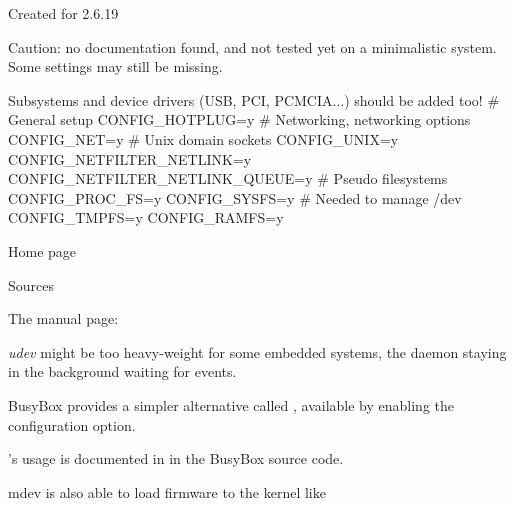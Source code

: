   \startitemize
  \item Created for 2.6.19
  \item Caution: no documentation found, and not tested yet on a minimalistic system. Some settings may still be missing.
  \item Subsystems and device drivers (USB, PCI, PCMCIA...) should be added too!
  \stopitemize
\starttyping
# General setup
CONFIG_HOTPLUG=y
# Networking, networking options
CONFIG_NET=y
# Unix domain sockets
CONFIG_UNIX=y
CONFIG_NETFILTER_NETLINK=y
CONFIG_NETFILTER_NETLINK_QUEUE=y
# Pseudo filesystems
CONFIG_PROC_FS=y
CONFIG_SYSFS=y
# Needed to manage /dev
CONFIG_TMPFS=y
CONFIG_RAMFS=y
\stoptyping


  \startitemize
  \item Home page\\
  \item Sources\\
  \item The  manual page:\\
  \stopitemize

  \startitemize
  \item {\em udev} might be too heavy-weight for some embedded
    systems, the  daemon staying in the background waiting for
    events.
  \item BusyBox provides a simpler alternative called ,
    available by enabling the  configuration option.
  \item {}'s usage is documented in  in the BusyBox source code.
  \item{}mdev is also able to load firmware to the kernel like
  \stopitemize


